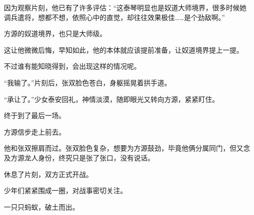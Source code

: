 \begin{this_body}
因为观察片刻，他已有了许多评估：“这泰琴明显也是奴道大师境界，很多时候她调兵遣将，想都不想，依照心中的直觉，却往往效果极佳……是个劲敌啊。”

方源的奴道境界，也只是大师级。

这让他微微后悔，早知如此，他的本体就应该提前准备，让奴道境界提上一提。

不过谁有能知晓得到，会出现这样的情况呢。

“我输了。”片刻后，张双脸色苍白，身躯摇晃着拱手道。

“承让了。”少女泰安回礼，神情淡漠，随即眼光又转向方源，紧紧盯住。

终于到了最后一场。

方源信步走上前去。

他和张双擦肩而过。张双脸色复杂，想要为方源鼓劲，毕竟他俩分属同门，但又念及方源龙人身份，终究只是张了张口，没有说话。

休息了片刻，双方正式开战。

少年们紧紧围成一圈，对战事密切关注。

一只只蚂蚁，破土而出。

\end{this_body}

